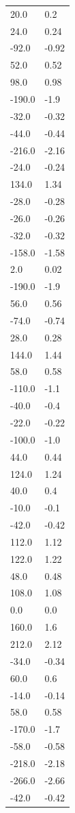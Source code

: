 \begin{longtable}{ll}
20.0 & 0.2 \\
24.0 & 0.24 \\
-92.0 & -0.92 \\
52.0 & 0.52 \\
98.0 & 0.98 \\
-190.0 & -1.9 \\
-32.0 & -0.32 \\
-44.0 & -0.44 \\
-216.0 & -2.16 \\
-24.0 & -0.24 \\
134.0 & 1.34 \\
-28.0 & -0.28 \\
-26.0 & -0.26 \\
-32.0 & -0.32 \\
-158.0 & -1.58 \\
2.0 & 0.02 \\
-190.0 & -1.9 \\
56.0 & 0.56 \\
-74.0 & -0.74 \\
28.0 & 0.28 \\
144.0 & 1.44 \\
58.0 & 0.58 \\
-110.0 & -1.1 \\
-40.0 & -0.4 \\
-22.0 & -0.22 \\
-100.0 & -1.0 \\
44.0 & 0.44 \\
124.0 & 1.24 \\
40.0 & 0.4 \\
-10.0 & -0.1 \\
-42.0 & -0.42 \\
112.0 & 1.12 \\
122.0 & 1.22 \\
48.0 & 0.48 \\
108.0 & 1.08 \\
0.0 & 0.0 \\
160.0 & 1.6 \\
212.0 & 2.12 \\
-34.0 & -0.34 \\
60.0 & 0.6 \\
-14.0 & -0.14 \\
58.0 & 0.58 \\
-170.0 & -1.7 \\
-58.0 & -0.58 \\
-218.0 & -2.18 \\
-266.0 & -2.66 \\
-42.0 & -0.42 \\

\end{longtable}
